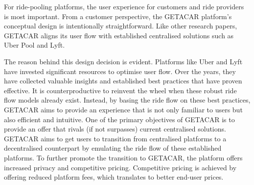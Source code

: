 For ride-pooling platforms, the user experience for customers and ride providers is most important. From a customer perspective, the GETACAR platform's conceptual design is intentionally straightforward. Like other research papers, GETACAR aligns its user flow with established centralised solutions such as Uber Pool and Lyft.

The reason behind this design decision is evident. Platforms like Uber and Lyft have invested significant resources to optimise user flow. Over the years, they have collected valuable insights and established best practices that have proven effective. It is counterproductive to reinvent the wheel when these robust ride flow models already exist. Instead, by basing the ride flow on these best practices, GETACAR aims to provide an experience that is not only familiar to users but also efficient and intuitive. 
One of the primary objectives of GETACAR is to provide an offer that rivals (if not surpasses) current centralised solutions. GETACAR aims to get users to transition from centralised platforms to a decentralised counterpart by emulating the ride flow of these established platforms. To further promote the transition to GETACAR, the platform offers increased privacy and competitive pricing.
Competitive pricing is achieved by offering reduced platform fees, which translates to better end-user prices. 

